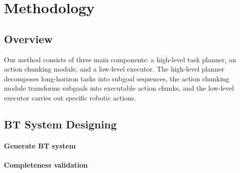\documentclass{article}
\begin{document}
\section{Methodology}



\subsection{Overview}

Our method consists of three main components: a high-level task planner, an action chunking module, and a low-level executor. The high-level planner decomposes long-horizon tasks into subgoal sequences, the action chunking module transforms subgoals into executable action chunks, and the low-level executor carries out specific robotic actions.


\subsection{BT System Designing}

\paragraph{Generate BT system}




\paragraph{Completeness validation}



\end{document}
